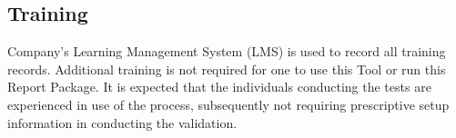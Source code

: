 \subsection{Training}
Company's Learning Management System (LMS) is used to record all training records.
Additional training is not required for one to use this Tool or run this
Report Package.  It is expected that the individuals conducting the tests are
experienced in use of the process, subsequently not requiring prescriptive setup
information in conducting the validation.

